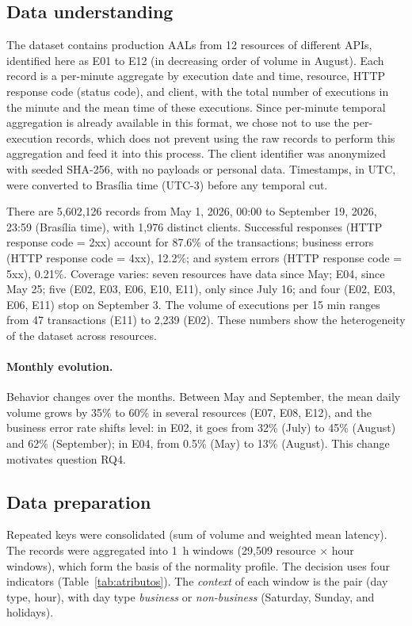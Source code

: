 \documentclass[sigconf,nonacm]{acmart}
\begin{document}
\subsection{Data understanding}
The dataset contains production AALs from 12 resources of different APIs, identified here as E01 to E12 (in decreasing order of volume in August). Each record is a per-minute aggregate by execution date and time, resource, HTTP response code (status code), and client, with the total number of executions in the minute and the mean time of these executions. Since per-minute temporal aggregation is already available in this format, we chose not to use the per-execution records, which does not prevent using the raw records to perform this aggregation and feed it into this process. The client identifier was anonymized with seeded SHA-256, with no payloads or personal data. Timestamps, in UTC, were converted to Brasília time (UTC-3) before any temporal cut.

There are 5,602,126 records from May 1, 2026, 00:00 to September 19, 2026, 23:59 (Brasília time), with 1,976 distinct clients. Successful responses (HTTP response code = 2xx) account for 87.6\% of the transactions; business errors (HTTP response code = 4xx), 12.2\%; and system errors (HTTP response code = 5xx), 0.21\%. Coverage varies: seven resources have data since May; E04, since May 25; five (E02, E03, E06, E10, E11), only since July 16; and four (E02, E03, E06, E11) stop on September 3. The volume of executions per 15 min ranges from 47 transactions (E11) to 2,239 (E02). These numbers show the heterogeneity of the dataset across resources.

\paragraph{Monthly evolution.} Behavior changes over the months. Between May and September, the mean daily volume grows by 35\% to 60\% in several resources (E07, E08, E12), and the business error rate shifts level: in E02, it goes from 32\% (July) to 45\% (August) and 62\% (September); in E04, from 0.5\% (May) to 13\% (August). This change motivates question RQ4.

\subsection{Data preparation}
Repeated keys were consolidated (sum of volume and weighted mean latency). The records were aggregated into 1~h windows (29,509 resource $\times$ hour windows), which form the basis of the normality profile. The decision uses four indicators (Table~\ref{tab:atributos}). The \emph{context} of each window is the pair (day type, hour), with day type \emph{business} or \emph{non-business} (Saturday, Sunday, and holidays).
\end{document}
